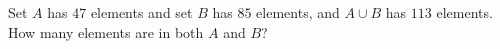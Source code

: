 Set $A$ has $47$ elements and set $B$ has $85$ elements, and $A\cup B$ has $113$ elements. How many elements are in both $A$ and $B$?
